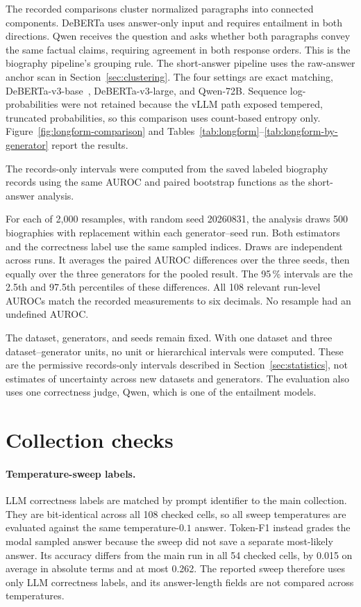 The recorded comparisons cluster normalized paragraphs into connected
components. DeBERTa uses answer-only input and requires entailment in both
directions. Qwen receives the question and asks whether both paragraphs convey
the same factual claims, requiring agreement in both response orders. This is
the biography pipeline's grouping rule.
The short-answer pipeline uses the raw-answer anchor scan in
Section~\ref{sec:clustering}. The four settings are exact matching,
DeBERTa-v3-base~\cite{sentence_transformers_nli_deberta_v3_base_2022},
DeBERTa-v3-large, and Qwen-72B. Sequence log-probabilities were not retained
because the vLLM path exposed tempered, truncated probabilities, so this
comparison uses count-based entropy only. Figure~\ref{fig:longform-comparison}
and Tables~\ref{tab:longform}--\ref{tab:longform-by-generator} report the results.

The records-only intervals were computed from the saved labeled biography
records using the same AUROC and paired bootstrap functions as the
short-answer analysis.

For each of 2{,}000 resamples, with random seed 20260831, the analysis draws
500 biographies with replacement within each generator--seed run. Both
estimators and the correctness label use the same sampled indices. Draws are
independent across runs. It averages the paired AUROC differences over the
three seeds, then equally over the three generators for the pooled result.
The 95\,\% intervals are the 2.5th and 97.5th percentiles of these differences.
All 108 relevant run-level AUROCs match the recorded measurements to six decimals.
No resample had an undefined AUROC.

The dataset, generators, and seeds remain fixed. With one dataset and three
dataset--generator units, no unit or hierarchical intervals were computed.
These are the permissive records-only intervals described in
Section~\ref{sec:statistics}, not estimates of uncertainty across
new datasets and generators. The evaluation also uses one correctness judge,
Qwen, which is one of the entailment models.

\section{Collection checks}
\label{app:collection-checks}

\paragraph{Temperature-sweep labels.}
LLM correctness labels are matched by prompt identifier to the main
collection. They are bit-identical across all 108 checked cells, so all sweep
temperatures are evaluated against the same temperature-$0.1$ answer.
Token-F1 instead grades the modal sampled answer because the sweep did not
save a separate most-likely answer. Its accuracy differs from the main run in
all 54 checked cells, by 0.015 on average in absolute terms and at most 0.262.
The reported sweep therefore uses only LLM correctness labels, and its
answer-length fields are not compared across temperatures.

